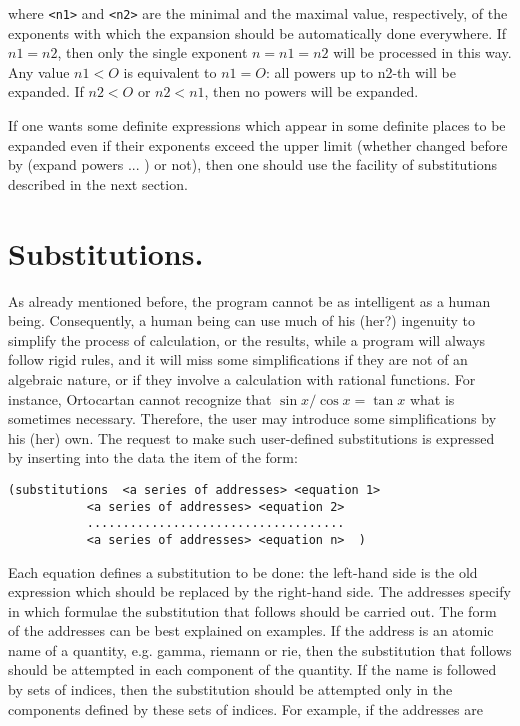 \noindent where \verb+<n1>+ and \verb+<n2>+ are the minimal and the  maximal
value, respectively,  of  the  exponents  with  which the expansion
     should be automatically done everywhere.  If  $n1 = n2$,
     then  only the single exponent $n = n1 = n2$ will be processed
     in this way. Any value $n1 < O$ is equivalent to $n1 = O$:  all
     powers  up to n2-th will be expanded. If $n2 < O$ or $n2 < n1$,
     then no powers will be expanded.

If one wants some definite expressions which appear  in
     some  definite places to be expanded even if their exponents
     exceed the upper limit (whether changed  before  by  (expand
     powers ... )  or  not),  then one should use the facility of
     substitutions described in the next section.

\section {Substitutions.}

As already mentioned before, the program cannot  be  as
     intelligent  as  a  human being. Consequently, a human being
     can use much of his (her?) ingenuity to simplify the process
     of  calculation, or the results, while a program will always
     follow rigid rules, and it will miss some simplifications if
     they  are  not  of an algebraic nature, or if they involve a
calculation with rational functions. For instance,  Ortocartan  cannot
recognize  that $\sin x / \cos x = \tan x$ what is
     sometimes necessary. Therefore, the user may introduce  some
     simplifications  by  his (her) own. The request to make such
     user-defined substitutions is expressed  by  inserting  into
     the data the item of the form:

\bigskip

\begin{verbatim}
(substitutions  <a series of addresses> <equation 1>
           <a series of addresses> <equation 2>
           ....................................
           <a series of addresses> <equation n>  )
\end{verbatim}

\bigskip

Each equation defines a substitution to  be done: the left-hand side is the old
expression which should be replaced by the right-hand  side.  The  addresses
specify  in which  formulae the substitution that follows should be carried
out. The form of the addresses can be  best  explained  on
     examples.  If  the  address is an atomic name of a quantity,
e.g. gamma, riemann or rie, then the substitution that  follows  should be
attempted in each component of the quantity. If the name is followed by sets of
indices, then the substitution should be attempted only in the components
defined by
     these sets of indices. For example, if the addresses are

